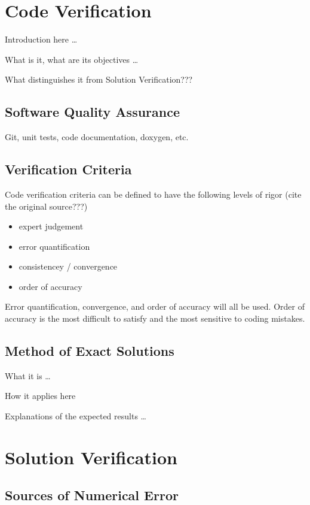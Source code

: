 \documentclass{mc2015}
\begin{document}
\section{Code Verification}

Introduction here \ldots

What is it, what are its objectives \ldots

What distinguishes it from Solution Verification???

\subsection{Software Quality Assurance}

Git, unit tests, code documentation, doxygen, etc.

\subsection{Verification Criteria}

Code verification criteria can be defined to
have the following levels of rigor \cite{Roy:2005:RCS:1082892.1082899}
(cite the original source???)

\begin{itemize}
  \item expert judgement
  \item error quantification
  \item consistencey / convergence
  \item order of accuracy
\end{itemize}

Error quantification, convergence, and order of accuracy will all be used. Order
of accuracy is the most difficult to satisfy and the most sensitive to coding
mistakes.

\subsection{Method of Exact Solutions}

What it is \ldots

How it applies here

Explanations of the expected results \ldots

\section{Solution Verification}

\subsection{Sources of Numerical Error}
\end{document}
